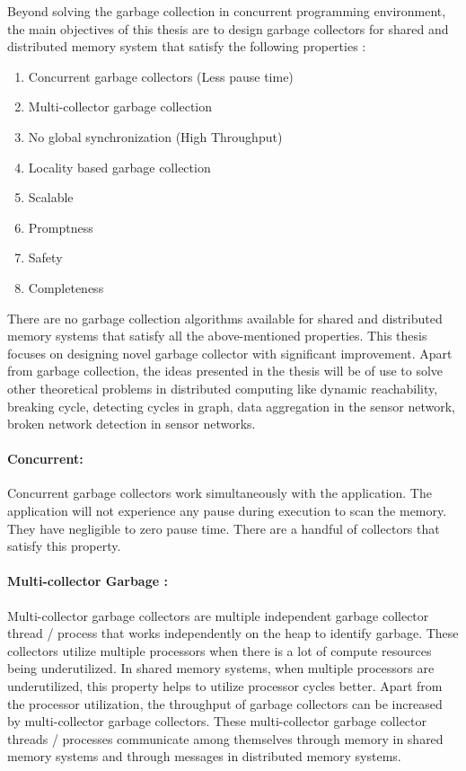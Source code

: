 Beyond solving the garbage collection in concurrent programming environment, the main objectives of this thesis are to design garbage collectors for shared and distributed memory system that satisfy the following properties :
\begin{enumerate}
	\item Concurrent garbage collectors (Less pause time)
	\item Multi-collector garbage collection
	\item No global synchronization (High Throughput)
	\item Locality based garbage collection
	\item Scalable
	\item Promptness
	\item Safety
	\item Completeness
\end{enumerate}

There are no garbage collection algorithms available for shared and distributed memory systems that satisfy all the above-mentioned properties.  This thesis focuses on designing novel garbage collector with significant improvement. Apart from garbage collection, the ideas presented in the thesis will be of use to solve other theoretical problems in distributed computing like dynamic reachability, breaking cycle, detecting cycles in graph, data aggregation in the sensor network, broken network detection in sensor networks.


\paragraph{Concurrent:}
Concurrent garbage collectors work simultaneously with the application. The application will not experience any pause during execution to scan the memory. They
have negligible to zero pause time. There are a handful of collectors that satisfy this property. 
\paragraph{Multi-collector Garbage :}
Multi-collector garbage collectors are multiple independent garbage collector thread / process that works independently on the heap to identify garbage. These collectors utilize multiple processors when there is a lot of compute resources being underutilized. In shared memory systems, when multiple processors are underutilized, this property helps to utilize processor cycles better. Apart from the processor utilization, the throughput of garbage collectors can be increased by multi-collector garbage collectors. These multi-collector garbage collector threads / processes communicate among themselves through memory in shared memory systems and through messages in distributed memory systems.
